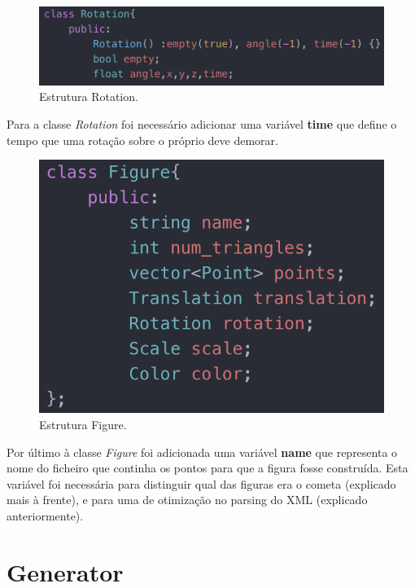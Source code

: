 \documentclass[a4paper]{article}
\begin{document}
\begin{figure}[H]
\centering
\includegraphics[scale=0.65]{rotation.png}
\caption{Estrutura Rotation.}
\label{img:rotation}
\end{figure}

Para a classe \textit{Rotation} foi necessário adicionar uma variável \textbf{time} que define o tempo que uma rotação sobre o próprio deve demorar.

\begin{figure}[H]
\centering
\includegraphics[scale=0.75]{figure.png}
\caption{Estrutura Figure.}
\label{img:figure}
\end{figure}

Por último à classe \textit{Figure} foi adicionada uma variável \textbf{name} que representa o nome do ficheiro que continha os pontos para que a figura fosse construída. Esta variável foi necessária para distinguir qual das figuras era o cometa (explicado mais à frente), e para uma de otimização no parsing do XML (explicado anteriormente).


\newpage

\section{Generator}
\label{sec:generator}
\end{document}

